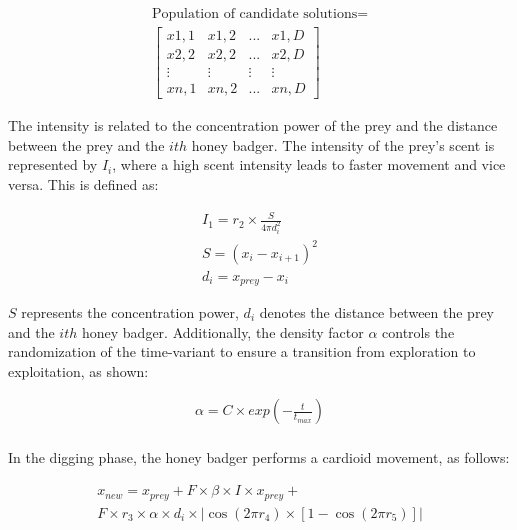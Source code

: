 \documentclass{elsarticle}
\begin{document}
\begin{equation}
\begin{gathered}
\text{Population of candidate solutions}=\\\begin{bmatrix}
  x1,1 & x1,2 & ... & x1,D  \\
  x2,2 & x2,2 & ... & x2,D  \\
  \vdots & \vdots & \vdots & \vdots \\
  xn,1 & xn,2 & ... & xn,D
\end{bmatrix}
\end{gathered}
\label{eq27}
\end{equation}

\noindent The intensity is related to the concentration power of the prey and the distance between the prey and the $ith$ honey badger. The intensity of the prey's scent is represented by $I_i$, where a high scent intensity leads to faster movement and vice versa. This is defined as:

\begin{equation}
\begin{gathered}
I_1 = r_2 \times \frac{S}{4 \pi d_i^2}\\
S = (x_i - x_{i+1})^2\\
d_i = x_{prey} - x_i
\end{gathered}
\label{eq28}
\end{equation}

\noindent $S$ represents the concentration power, $d_i$ denotes the distance between the prey and the $ith$ honey badger. Additionally, the density factor $\alpha$ controls the randomization of the time-variant to ensure a transition from exploration to exploitation, as shown:

\begin{equation}
\begin{gathered}
\alpha = C \times exp\left(-\frac{t}{t_{max}}\right)\\
\end{gathered}
\label{eq29}
\end{equation}

\noindent In the digging phase, the honey badger performs a cardioid movement, as follows:

\begin{equation}
\begin{gathered}
x_{new} = x_{prey} + F \times \beta \times I \times x_{prey} + \\
F \times r_3 \times \alpha \times d_i \times \left|\cos(2\pi r_4) \times [1-\cos(2\pi r_5)]\right|
\end{gathered}
\label{eq30}
\end{equation}
\end{document}
